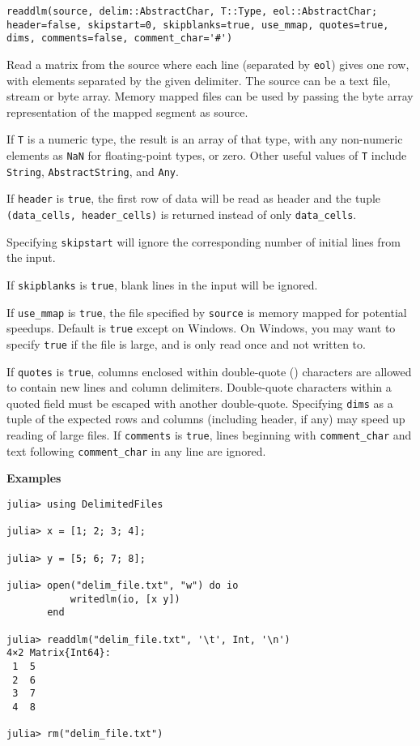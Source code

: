 \begin{adjustwidth}{2em}{0pt}


\begin{verbatim}
readdlm(source, delim::AbstractChar, T::Type, eol::AbstractChar; header=false, skipstart=0, skipblanks=true, use_mmap, quotes=true, dims, comments=false, comment_char='#')
\end{verbatim}

Read a matrix from the source where each line (separated by \texttt{eol}) gives one row, with elements separated by the given delimiter. The source can be a text file, stream or byte array. Memory mapped files can be used by passing the byte array representation of the mapped segment as source.

If \texttt{T} is a numeric type, the result is an array of that type, with any non-numeric elements as \texttt{NaN} for floating-point types, or zero. Other useful values of \texttt{T} include \texttt{String}, \texttt{AbstractString}, and \texttt{Any}.

If \texttt{header} is \texttt{true}, the first row of data will be read as header and the tuple \texttt{(data\_cells, header\_cells)} is returned instead of only \texttt{data\_cells}.

Specifying \texttt{skipstart} will ignore the corresponding number of initial lines from the input.

If \texttt{skipblanks} is \texttt{true}, blank lines in the input will be ignored.

If \texttt{use\_mmap} is \texttt{true}, the file specified by \texttt{source} is memory mapped for potential speedups. Default is \texttt{true} except on Windows. On Windows, you may want to specify \texttt{true} if the file is large, and is only read once and not written to.

If \texttt{quotes} is \texttt{true}, columns enclosed within double-quote ({\textquotedbl}) characters are allowed to contain new lines and column delimiters. Double-quote characters within a quoted field must be escaped with another double-quote.  Specifying \texttt{dims} as a tuple of the expected rows and columns (including header, if any) may speed up reading of large files.  If \texttt{comments} is \texttt{true}, lines beginning with \texttt{comment\_char} and text following \texttt{comment\_char} in any line are ignored.

\textbf{Examples}


\begin{verbatim}
julia> using DelimitedFiles

julia> x = [1; 2; 3; 4];

julia> y = [5; 6; 7; 8];

julia> open("delim_file.txt", "w") do io
           writedlm(io, [x y])
       end

julia> readdlm("delim_file.txt", '\t', Int, '\n')
4×2 Matrix{Int64}:
 1  5
 2  6
 3  7
 4  8

julia> rm("delim_file.txt")
\end{verbatim}



\end{adjustwidth}
